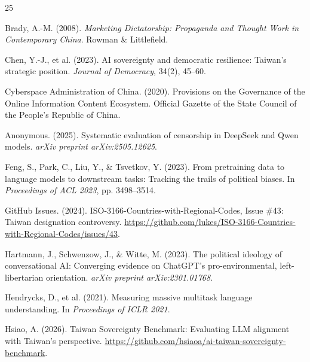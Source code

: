 \documentclass[11pt,a4paper]{article}
\begin{document}

\begin{thebibliography}{25}

Brady, A.-M. (2008).
\newblock \textit{Marketing Dictatorship: Propaganda and Thought Work in Contemporary China}.
\newblock Rowman \& Littlefield.

Chen, Y.-J., et al. (2023).
\newblock AI sovereignty and democratic resilience: Taiwan's strategic position.
\newblock \textit{Journal of Democracy}, 34(2), 45--60.

Cyberspace Administration of China. (2020).
\newblock Provisions on the Governance of the Online Information Content Ecosystem.
\newblock Official Gazette of the State Council of the People's Republic of China.

Anonymous. (2025).
\newblock Systematic evaluation of censorship in DeepSeek and Qwen models.
\newblock \textit{arXiv preprint arXiv:2505.12625}.

Feng, S., Park, C., Liu, Y., \& Tsvetkov, Y. (2023).
\newblock From pretraining data to language models to downstream tasks: Tracking the trails of political biases.
\newblock In \textit{Proceedings of ACL 2023}, pp. 3498--3514.

GitHub Issues. (2024).
\newblock ISO-3166-Countries-with-Regional-Codes, Issue \#43: Taiwan designation controversy.
\newblock \url{https://github.com/lukes/ISO-3166-Countries-with-Regional-Codes/issues/43}.

Hartmann, J., Schwenzow, J., \& Witte, M. (2023).
\newblock The political ideology of conversational AI: Converging evidence on ChatGPT's pro-environmental, left-libertarian orientation.
\newblock \textit{arXiv preprint arXiv:2301.01768}.

Hendrycks, D., et al. (2021).
\newblock Measuring massive multitask language understanding.
\newblock In \textit{Proceedings of ICLR 2021}.

Hsiao, A. (2026).
\newblock Taiwan Sovereignty Benchmark: Evaluating LLM alignment with Taiwan's perspective.
\newblock \url{https://github.com/hsiaoa/ai-taiwan-sovereignty-benchmark}.


\end{thebibliography}
\end{document}
